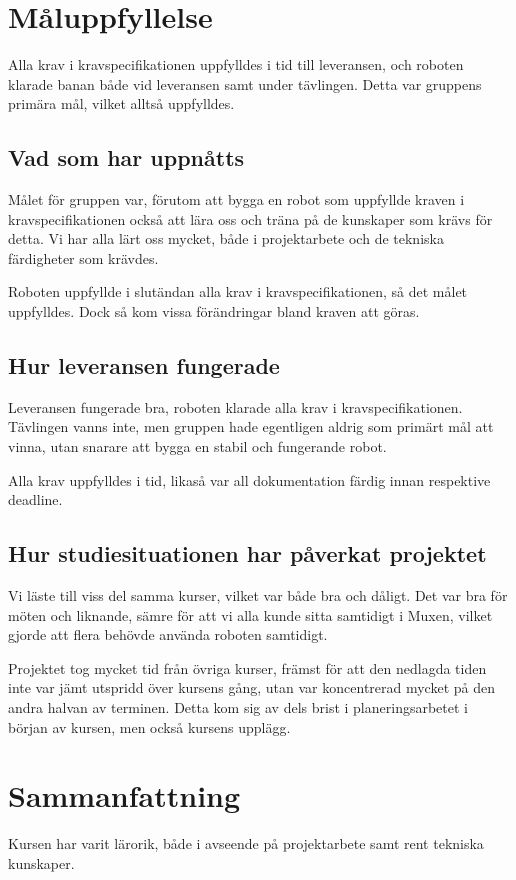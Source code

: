 \documentclass[a4paper,12pt]{article}
\begin{document}
\section{Måluppfyllelse}
Alla krav i kravspecifikationen uppfylldes i tid till leveransen, och roboten klarade banan både vid leveransen samt
under tävlingen. Detta var gruppens primära mål, vilket alltså uppfylldes. 

\subsection{Vad som har uppnåtts}
Målet för gruppen var, förutom att bygga en robot som uppfyllde kraven i kravspecifikationen också att lära oss 
och träna på de kunskaper som krävs för detta. Vi har alla lärt oss mycket, både i projektarbete och de tekniska 
färdigheter som krävdes. 

Roboten uppfyllde i slutändan alla krav i kravspecifikationen, så det målet uppfylldes. Dock så kom vissa förändringar
bland kraven att göras. 

\subsection{Hur leveransen fungerade}
Leveransen fungerade bra, roboten klarade alla krav i kravspecifikationen. Tävlingen vanns inte, men gruppen hade 
egentligen aldrig som primärt mål att vinna, utan snarare att bygga en stabil och fungerande robot.

Alla krav uppfylldes i tid, likaså var all dokumentation färdig innan respektive deadline. 

\subsection{Hur studiesituationen har påverkat projektet}
Vi läste till viss del samma kurser, vilket var både bra och dåligt. Det var bra för möten och liknande, sämre för att vi alla 
kunde sitta samtidigt i Muxen, vilket gjorde att flera behövde använda roboten samtidigt. 

Projektet tog mycket tid från övriga kurser, främst för att den nedlagda tiden inte var jämt utspridd över kursens gång, 
utan var koncentrerad mycket på den andra halvan av terminen. Detta kom sig av dels brist i planeringsarbetet i början
av kursen, men också kursens upplägg. 


\section{Sammanfattning}
Kursen har varit lärorik, både i avseende på projektarbete samt rent tekniska kunskaper. 
\end{document}
